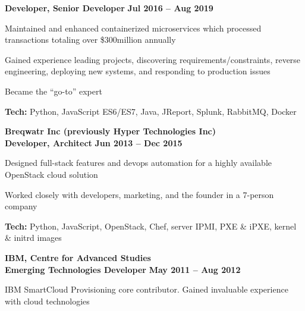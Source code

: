 \documentclass[margin,line]{resume}
\begin{document}
\begin{resume}
    \hspace{2.6mm}\textbf{Developer, Senior Developer} \hfill \textbf{Jul 2016 -- Aug 2019}\vspace{1mm}
    \begin{list2}
        \item Maintained and enhanced containerized microservices which processed transactions totaling over \$300million annually
        \vspace{1mm}
        \item Gained experience leading projects, discovering requirements/constraints, reverse engineering, deploying new systems, and responding to production issues
        \vspace{1mm}
        \item Became the “go-to” expert
        \vspace{1mm}
        \item\textbf{Tech:} Python, JavaScript ES6/ES7, Java, JReport, Splunk, RabbitMQ, Docker
    \end{list2}

    \hspace{-3mm}\textbf{\listing Breqwatr Inc (previously Hyper Technologies Inc)} \vspace{2mm}\\\vspace{1mm}
    \hspace{1.2mm}\textbf{Developer, Architect} \hfill \textbf{Jun 2013 -- Dec 2015}\vspace{1mm}
    \begin{list2}
        \item Designed full-stack features and devops automation for a highly available OpenStack cloud solution
        \vspace{1mm}
        \item Worked closely with developers, marketing, and the founder in a 7-person company
        \vspace{1mm}
        \item\textbf{Tech:} Python, JavaScript, OpenStack, Chef, server IPMI, PXE \& iPXE, kernel \& initrd images
    \end{list2}

    \hspace{-3mm}\textbf{\listing IBM, Centre for Advanced Studies}\vspace{2mm}\\\vspace{1mm}
    \hspace{1.2mm}\textbf{Emerging Technologies Developer} \hfill \textbf{May 2011 -- Aug 2012}\vspace{1mm}
    \begin{list2}
        \item IBM SmartCloud Provisioning core contributor. Gained invaluable experience with cloud technologies
    \end{list2}


\end{resume}
\end{document}
